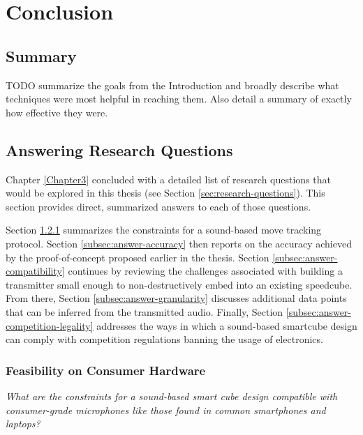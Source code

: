 
\chapter{Conclusion} %

\label{Chapter8} %


\section{Summary}

TODO summarize the goals from the Introduction and broadly describe
what techniques were most helpful in reaching them. Also detail a
summary of exactly how effective they were.

\section{Answering Research Questions}
\label{sec:answering-research-questions}

Chapter \ref{Chapter3} concluded with a detailed list of research
questions that would be explored in this thesis (see Section
\ref{sec:research-questions}). This section provides direct, summarized
answers to each of those questions.

Section \ref{subsec:answer-feasibility} summarizes the constraints for
a sound-based move tracking protocol. Section
\ref{subsec:answer-accuracy} then reports on the accuracy achieved by
the proof-of-concept proposed earlier in the thesis. Section
\ref{subsec:answer-compatibility} continues by reviewing the challenges
associated with building a transmitter small enough to
non-destructively embed into an existing speedcube. From there, Section
\ref{subsec:answer-granularity} discusses additional data points that
can be inferred from the transmitted audio. Finally, Section
\ref{subsec:answer-competition-legality} addresses the ways in which a
sound-based smartcube design can comply with competition regulations
banning the usage of electronics.

\subsection{Feasibility on Consumer Hardware}
\label{subsec:answer-feasibility}

\emph{What are the constraints for a sound-based smart cube design
compatible with consumer-grade microphones like those found in common
smartphones and laptops?}

